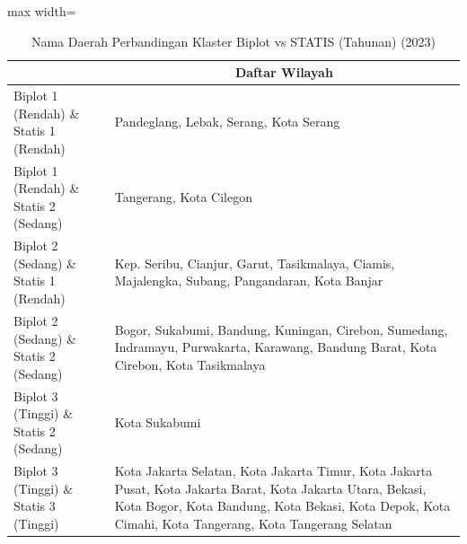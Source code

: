 \begin{table}[H]
\centering
\caption{Nama Daerah Perbandingan Klaster Biplot vs STATIS (Tahunan) (2023)} \label{tab:app2biplot_statis_comp_name_2023}
\begin{adjustbox}{max width=\textwidth}
\begin{tabular}{|>{\centering\arraybackslash}p{4cm}|p{10cm}|}
\hline
\multicolumn{1}{|c|}{\textbf{Kategori}} & \multicolumn{1}{c|}{\textbf{Daftar Wilayah}} \\
\hline
Biplot 1 (Rendah) \& Statis 1 (Rendah) & Pandeglang, Lebak, Serang, Kota Serang \\
\hline
Biplot 1 (Rendah) \& Statis 2 (Sedang) & Tangerang, Kota Cilegon \\
\hline
Biplot 2 (Sedang) \& Statis 1 (Rendah) & Kep. Seribu, Cianjur, Garut, Tasikmalaya, Ciamis, Majalengka, Subang, Pangandaran, Kota Banjar \\
\hline
Biplot 2 (Sedang) \& Statis 2 (Sedang) & Bogor, Sukabumi, Bandung, Kuningan, Cirebon, Sumedang, Indramayu, Purwakarta, Karawang, Bandung Barat, Kota Cirebon, Kota Tasikmalaya \\
\hline
Biplot 3 (Tinggi) \& Statis 2 (Sedang) & Kota Sukabumi \\
\hline
Biplot 3 (Tinggi) \& Statis 3 (Tinggi) & Kota Jakarta Selatan, Kota Jakarta Timur, Kota Jakarta Pusat, Kota Jakarta Barat, Kota Jakarta Utara, Bekasi, Kota Bogor, Kota Bandung, Kota Bekasi, Kota Depok, Kota Cimahi, Kota Tangerang, Kota Tangerang Selatan \\
\hline
\end{tabular}
\end{adjustbox}
\end{table}